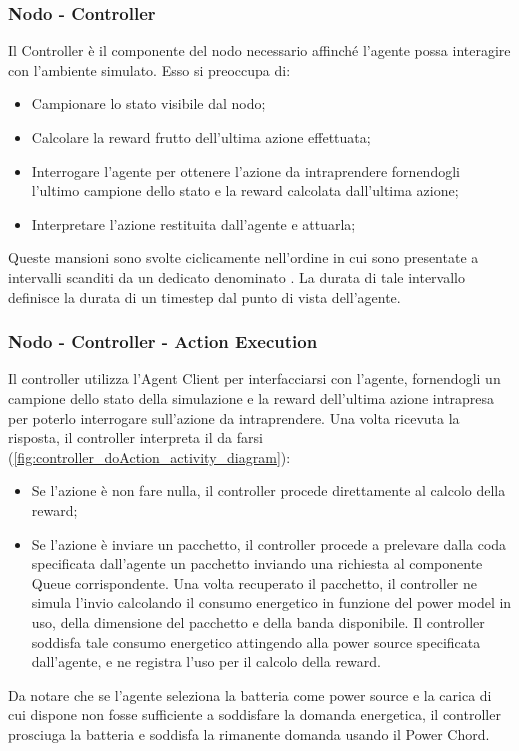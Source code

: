 \documentclass[conference]{IEEEtran}
\begin{document}
\subsubsection{Nodo - Controller}
Il Controller è il componente del nodo necessario affinché l'agente possa interagire con
l'ambiente simulato. Esso si preoccupa di:
\begin{itemize}
    \item Campionare lo stato visibile dal nodo;
    \item Calcolare la reward frutto dell'ultima azione effettuata;
    \item Interrogare l'agente per ottenere l'azione da intraprendere fornendogli 
    l'ultimo campione dello stato e la reward calcolata dall'ultima azione;
    \item Interpretare l'azione restituita dall'agente e attuarla;
\end{itemize} 
Queste mansioni sono svolte ciclicamente nell'ordine in cui sono presentate
a intervalli scanditi da un  dedicato denominato
. La durata di tale intervallo
definisce la durata di un timestep dal punto di vista dell'agente.

\subsubsection{Nodo - Controller - Action Execution}
Il controller utilizza l'Agent Client per interfacciarsi con l'agente, fornendogli un
campione dello stato della simulazione e la reward dell'ultima azione intrapresa per
poterlo interrogare sull'azione da intraprendere. Una volta ricevuta la risposta, il
controller interpreta il da farsi (\autoref{fig:controller_doAction_activity_diagram}):
\begin{itemize}
    \item Se l'azione è non fare nulla, il controller procede direttamente al calcolo
    della reward;
    \item Se l'azione è inviare un pacchetto, il controller procede a prelevare dalla
    coda specificata dall'agente un pacchetto inviando una richiesta al componente Queue
    corrispondente. Una volta recuperato il pacchetto, il controller ne simula l'invio
    calcolando il consumo energetico in funzione del power model in uso, della dimensione
    del pacchetto e della banda disponibile. Il controller soddisfa tale
    consumo energetico attingendo alla power source specificata dall'agente, e ne
    registra l'uso per il calcolo della reward.
\end{itemize}
Da notare che se l'agente seleziona la batteria come power source e la carica di cui
dispone non fosse sufficiente a soddisfare la domanda energetica, il controller prosciuga
la batteria e soddisfa la rimanente domanda usando il Power Chord.
\end{document}

